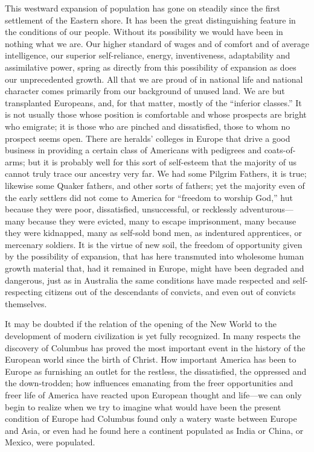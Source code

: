 \documentclass{book}
\begin{document}
This westward expansion of population has gone on steadily since the first settlement of the Eastern shore. It has been the great distinguishing feature in the conditions of our people. Without its possibility we would have been in nothing what we are. Our higher standard of wages and of comfort and of average intelligence, our superior self-reliance, energy, inventiveness, adaptability and assimilative power, spring as directly from this possibility of expansion as does our unprecedented growth. All that we are proud of in national life and national character comes primarily from our background of unused land. We are but transplanted Europeans, and, for that matter, mostly of the “inferior classes.” It is not usually those whose position is comfortable and whose prospects are bright who emigrate; it is those who are pinched and dissatisfied, those to whom no prospect seems open. There are heralds’ colleges in Europe that drive a good business in providing a certain class of Americans with pedigrees and coats-of-arms; but it is probably well for this sort of self-esteem that the majority of us cannot truly trace our ancestry very far. We had some Pilgrim Fathers, it is true; likewise some Quaker fathers, and other sorts of fathers; yet the majority even of the early settlers did not come to America for “freedom to worship God,” hut because they were poor, dissatisfied, unsuccessful, or recklessly adventurous—many because they were evicted, many to escape imprisonment, many because they were kidnapped, many as self-sold bond men, as indentured apprentices, or mercenary soldiers. It is the virtue of new soil, the freedom of opportunity given by the possibility of expansion, that has here transmuted into wholesome human growth material that, had it remained in Europe, might have been degraded and dangerous, just as in Australia the same conditions have made respected and self-respecting citizens out of the descendants of convicts, and even out of convicts themselves.

It may be doubted if the relation of the opening of the New World to the development of modern civilization is yet fully recognized. In many respects the discovery of Columbus has proved the most important event in the history of the European world since the birth of Christ. How important America has been to Europe as furnishing an outlet for the restless, the dissatisfied, the oppressed and the down-trodden; how influences emanating from the freer opportunities and freer life of America have reacted upon European thought and life—we can only begin to realize when we try to imagine what would have been the present condition of Europe had Columbus found only a watery waste between Europe and Asia, or even had he found here a continent populated as India or China, or Mexico, were populated.
\end{document}
